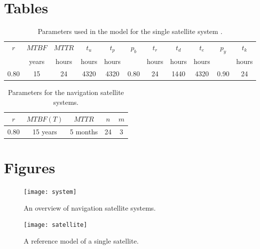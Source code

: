 \documentclass[preprint,12pt]{qrei}
\begin{document}
\clearpage

\section*{Tables}


\begin{table*}[ht]
\centering
\begin{tabular}[l]{@{}ccccccccccc}
\hline
  $r$ & $MTBF$ & $MTTR$ & $t_{u}$ & $t_{p}$ & $p_{b}$ & $t_{r}$ & $t_{d}$ & $t_{e}$ & $p_{y}$ & $t_{k}$ \\
 & years & hours & hours & hours & & hours & hours & hours & & hours\\
\hline
  0.80 & 15 & 24 & 4320 & 4320 & 0.80 & 24 & 1440 & 4320 & 0.90 & 24\\
\hline
\end{tabular}
\caption{Parameters used in the model for the single satellite system .}
\label{tab:one}
\end{table*}

\begin{table*}[ht]
\centering
\begin{tabular}[l]{@{}ccccc}
\hline
  $r$ & $MTBF (T)$ & $MTTR$ & $n$ & $m$ \\
\hline
   0.80 & 15 years & 5 months & 24 & 3 \\
\hline
\end{tabular}
\caption{Parameters for the navigation satellite systems.}
\label{tab:two}
\end{table*}


\clearpage

\section*{Figures}

\begin{figure*}[ht]
\begin{center}
\texttt{[image: system]}
\caption{An overview of navigation satellite systems.}
\label{fig:system}
\end{center}
\end{figure*}

\begin{figure*}[ht]
\begin{center}
\texttt{[image: satellite]}
\caption{A reference model of a single satellite.}
\label{fig:model}
\end{center}
\end{figure*}
\end{document}
